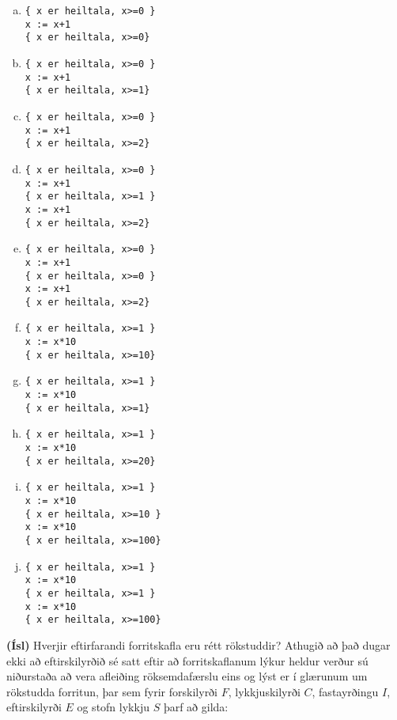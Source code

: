 \documentclass{article}
\begin{document}
\begin{enumerate}[a)]
\item
\begin{verbatim}
{ x er heiltala, x>=0 }
x := x+1
{ x er heiltala, x>=0}
\end{verbatim}
\item
\begin{verbatim}
{ x er heiltala, x>=0 }
x := x+1
{ x er heiltala, x>=1}
\end{verbatim}
\item
\begin{verbatim}
{ x er heiltala, x>=0 }
x := x+1
{ x er heiltala, x>=2}
\end{verbatim}
\item
\begin{verbatim}
{ x er heiltala, x>=0 }
x := x+1
{ x er heiltala, x>=1 }
x := x+1
{ x er heiltala, x>=2}
\end{verbatim}
\item
\begin{verbatim}
{ x er heiltala, x>=0 }
x := x+1
{ x er heiltala, x>=0 }
x := x+1
{ x er heiltala, x>=2}
\end{verbatim}
\item
\begin{verbatim}
{ x er heiltala, x>=1 }
x := x*10
{ x er heiltala, x>=10}
\end{verbatim}
\item
\begin{verbatim}
{ x er heiltala, x>=1 }
x := x*10
{ x er heiltala, x>=1}
\end{verbatim}
\item
\begin{verbatim}
{ x er heiltala, x>=1 }
x := x*10
{ x er heiltala, x>=20}
\end{verbatim}
\item
\begin{verbatim}
{ x er heiltala, x>=1 }
x := x*10
{ x er heiltala, x>=10 }
x := x*10
{ x er heiltala, x>=100}
\end{verbatim}
\item
\begin{verbatim}
{ x er heiltala, x>=1 }
x := x*10
{ x er heiltala, x>=1 }
x := x*10
{ x er heiltala, x>=100}
\end{verbatim}
\end{enumerate}

\question

\textbf{(Ísl)} Hverjir eftirfarandi forritskafla eru rétt rökstuddir?
Athugið að það dugar ekki að eftirskilyrðið sé satt
eftir að forritskaflanum lýkur heldur verður sú niðurstaða
að vera afleiðing röksemdafærslu eins og lýst er í glærunum
um rökstudda forritun, þar sem fyrir forskilyrði $F$, lykkjuskilyrði
$C$, fastayrðingu $I$, eftirskilyrði $E$ og stofn lykkju $S$ þarf að
gilda:
\end{document}
